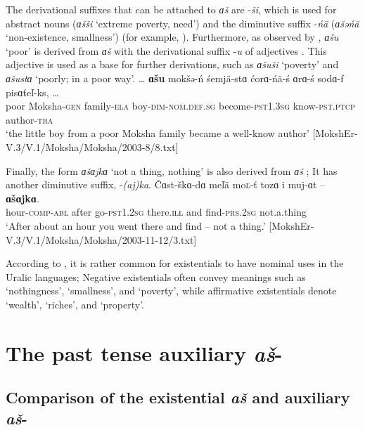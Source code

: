 \documentclass[output=paper]{langsci/langscibook}
\begin{document}
  The derivational suffixes that can be attached to \textit{ɑš} are -\textit{ši}, which is used for abstract nouns (\textit{ɑšši} `extreme poverty, need') and the diminutive suffix -\textit{ńä} (\textit{ɑšəńä} `non-existence, smallness') (for example, \citealt[73]{MWb}). Furthermore, as observed by \citet[79]{Bartens1996}, \textit{ɑšu} `poor' is derived from \textit{ɑš} with the derivational suffix -\textit{u} of adjectives . This adjective is used as a base for further derivations, such as \textit{ɑšuši} `poverty' and \textit{ɑšustɑ} `poorly; in a poor way'.
\ea\label{ex:moksha-poor}
\gll \ob\ldots{\cb} \textbf{ɑšu} mokšə-ń śemjä-stɑ ćorɑ-ńä-ś
ɑrɑ-ś sodɑ-f pisɑťeľ-ks, \ob\ldots{\cb}\\
{} poor Moksha-\textsc{gen} family-\textsc{ela} boy-\textsc{dim-nom.def.sg} become-\textsc{pst1.3sg} know-\textsc{pst.ptcp} author-\textsc{tra}\\
\glt `the little boy from a poor Moksha family became a well-know author' [MokshEr-V.3/V.1/Moksha/Moksha/2003-8/8.txt]
\z

  Finally, the form \textit{ɑšɑjkɑ} `not a thing, nothing' \citep[51]{MRV} is also derived from \textit{ɑš} ; It has another diminutive suffix, -\textit{(aj)ka}.
\ea\label{ex:moksha-find}
\gll Čɑst-škɑ-dɑ meľä mo\textsc{ľ}-ť tozɑ i muj-ɑt -- \textbf{ɑšɑjkɑ}.\\
hour-\textsc{comp-abl} after go-\textsc{pst1.2sg} there.\textsc{ill} and find-\textsc{prs.2sg} {} not.a.thing\\
\glt `After about an hour you went there and find -- not a thing.' [MokshEr-V.3/V.1/Moksha/Moksha/2003-11-12/3.txt]
\z

  According to \citet[in passim]{Bartens1996}, it is rather common for existentials to have nominal uses in the Uralic languages; Negative existentials often convey meanings such as `nothingness', `smallness', and `poverty', while affirmative existentials denote `wealth', `riches', and `property'.

\section{The past tense auxiliary \textit{aš}-}\label{sec:2:6}

\subsection{Comparison of the existential \textit{aš} and auxiliary \textit{aš}-}\label{sec:2:6.1}
\end{document}
